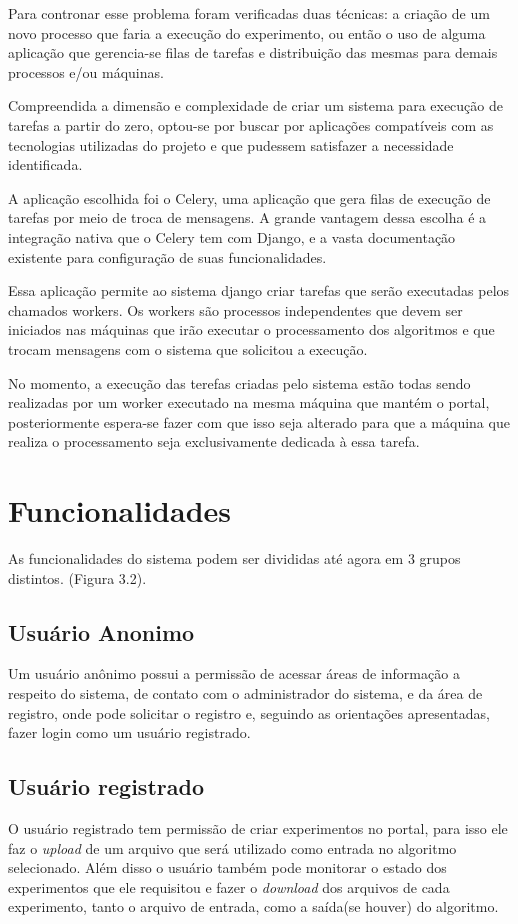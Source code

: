\documentclass[tg]{mdtufsm}
\begin{document}
Para contronar esse problema foram verificadas duas técnicas: a criação de um novo processo que faria a execução do experimento, ou então o uso de alguma aplicação que gerencia-se filas de tarefas e distribuição das mesmas para demais processos e/ou máquinas.

Compreendida a dimensão e complexidade de criar um sistema para execução de tarefas a partir do zero, optou-se por buscar por aplicações compatíveis com as tecnologias utilizadas do projeto e que pudessem satisfazer a necessidade identificada.

A aplicação escolhida foi o Celery, uma aplicação que gera filas de execução de tarefas por meio de troca de mensagens. A grande vantagem dessa escolha é a integração nativa que o Celery tem com Django, e a vasta documentação existente para configuração de suas funcionalidades.

Essa aplicação permite ao sistema django criar tarefas que serão executadas pelos chamados workers. Os workers são processos independentes que devem ser iniciados nas máquinas que irão executar o processamento dos algoritmos e que trocam mensagens com o sistema que solicitou a execução.

No momento, a execução das terefas criadas pelo sistema estão todas sendo realizadas por um worker executado na mesma máquina que mantém o portal, posteriormente espera-se fazer com que isso seja alterado para que a máquina que realiza o processamento seja exclusivamente dedicada à essa tarefa.

\section{Funcionalidades}
As funcionalidades do sistema podem ser divididas até agora em 3 grupos distintos. (Figura 3.2).
\subsection{Usuário Anonimo}
Um usuário anônimo possui a permissão de acessar áreas de informação a respeito do sistema, de contato com o administrador do sistema, e da área de registro, onde pode solicitar o registro e, seguindo as orientações apresentadas, fazer login como um usuário registrado.
\subsection{Usuário registrado}
O usuário registrado tem permissão de criar experimentos no portal, para isso ele faz o \emph{upload} de um arquivo que será utilizado como entrada no algoritmo selecionado. Além disso o usuário também pode monitorar o estado dos experimentos que ele requisitou e fazer o \emph{download} dos arquivos de cada experimento, tanto o arquivo de entrada, como a saída(se houver) do algoritmo.
\end{document}
